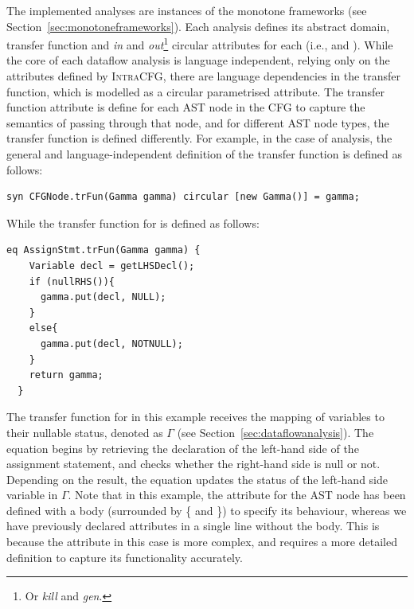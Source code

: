 The implemented analyses are instances of the monotone frameworks (see Section~\ref{sec:monotoneframeworks}).
Each analysis defines its abstract domain, transfer function and \emph{in} and
\emph{out}\footnote{Or \emph{kill} and \emph{gen}.} circular attributes for each  (i.e.,  and  ).
While the core of each dataflow analysis is language independent, relying only on the
attributes defined by \textsc{IntraCFG}, there are language dependencies in the
transfer function, which is modelled as a circular parametrised attribute.
The transfer function attribute is define for each AST node in the CFG to capture the semantics of passing
through that node, and for different AST node types, the transfer function is defined differently.
For example, in the case of  analysis,
the general and language-independent definition of the transfer function is
defined as follows:
\begin{lstlisting}[language=JastAdd]
  syn CFGNode.trFun(Gamma gamma) circular [new Gamma()] = gamma;
\end{lstlisting}
While the transfer function for  is defined as follows:
\begin{lstlisting}[language=JastAdd]
  eq AssignStmt.trFun(Gamma gamma) {
    Variable decl = getLHSDecl();
    if (nullRHS()){
      gamma.put(decl, NULL);
    }
    else{
      gamma.put(decl, NOTNULL);
    }
    return gamma;
  }
\end{lstlisting}
The transfer function for  in this example receives the
mapping of variables to their nullable status, denoted as $\Gamma$
(see Section~\ref{sec:dataflowanalysis}). The equation begins by retrieving the
declaration of the left-hand side of the assignment statement, and
checks whether the right-hand side is null or not.
Depending on the result, the equation updates the status of the left-hand side
variable in $\Gamma$.
Note that in this example, the attribute  for the AST node  has been defined with a
body (surrounded by \{ and \}) to specify its behaviour, whereas we have previously declared attributes in a
single line without the body. This is because the attribute in this case is more
complex, and requires a more detailed definition to capture its functionality accurately.










